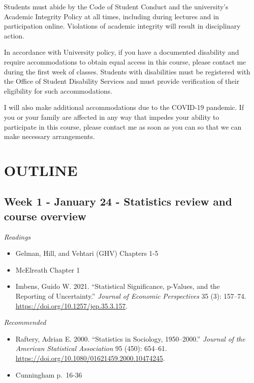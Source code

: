 \documentclass[
  10pt,
]{article}
\providecommand{\tightlist}{%
  \setlength{\itemsep}{0pt}\setlength{\parskip}{0pt}}
\begin{document}
Students must abide by the Code of Student Conduct and the university's
Academic Integrity Policy at all times, including during lectures and in
participation online. Violations of academic integrity will result in
disciplinary action.

In accordance with University policy, if you have a documented
disability and require accommodations to obtain equal access in this
course, please contact me during the first week of classes. Students
with disabilities must be registered with the Office of Student
Disability Services and must provide verification of their eligibility
for such accommodations.

I will also make additional accommodations due to the COVID-19 pandemic.
If you or your family are affected in any way that impedes your ability
to participate in this course, please contact me as soon as you can so
that we can make necessary arrangements.

\hypertarget{outline}{%
\section{OUTLINE}\label{outline}}

\hypertarget{week-1---january-24---statistics-review-and-course-overview}{%
\subsection{Week 1 - January 24 - Statistics review and course
overview}\label{week-1---january-24---statistics-review-and-course-overview}}

\emph{Readings}

\begin{itemize}
\tightlist
\item
  Gelman, Hill, and Vehtari (GHV) Chapters 1-5
\item
  McElreath Chapter 1
\item
  Imbens, Guido W. 2021. ``Statistical Significance, p-Values, and the
  Reporting of Uncertainty.'' \emph{Journal of Economic Perspectives} 35
  (3): 157--74. \url{https://doi.org/10.1257/jep.35.3.157}.
\end{itemize}

\emph{Recommended}

\begin{itemize}
\tightlist
\item
  Raftery, Adrian E. 2000. ``Statistics in Sociology, 1950--2000.''
  \emph{Journal of the American Statistical Association} 95 (450):
  654--61. \url{https://doi.org/10.1080/01621459.2000.10474245}.
\item
  Cunningham p.~16-36
\end{itemize}
\end{document}
